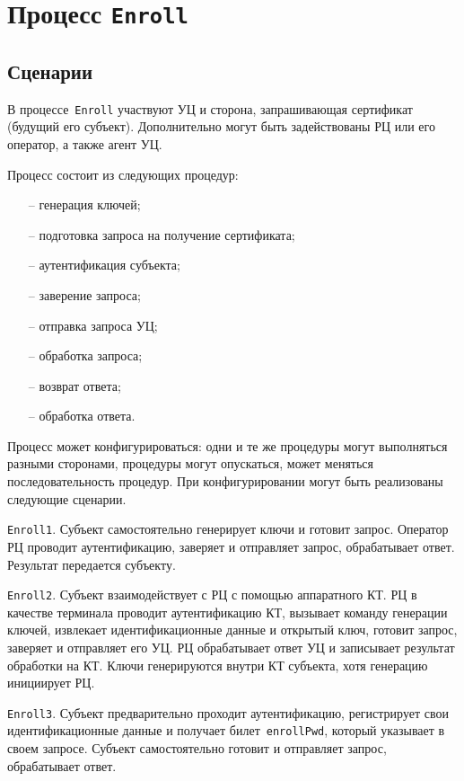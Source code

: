 \section{Процесс \texttt{Enroll}}\label{PROCESSES.Enroll}

\subsection{Сценарии}\label{PROCESSES.Enroll.List}

В процессе~\texttt{Enroll} участвуют УЦ и сторона, запрашивающая 
сертификат (будущий его субъект). Дополнительно могут быть задействованы
РЦ или его оператор, а также агент УЦ. 

Процесс состоит из следующих процедур:
\begin{itemize}
\item[--]
генерация ключей;
\item[--]
подготовка запроса на получение сертификата;
\item[--]
аутентификация субъекта;
\item[--]
заверение запроса;
\item[--]
отправка запроса УЦ;
\item[--]
обработка запроса;
\item[--]
возврат ответа;
\item[--]
обработка ответа.
\end{itemize}

Процесс может конфигурироваться: 
одни и те же процедуры могут выполняться разными сторонами,
процедуры могут опускаться, может меняться последовательность 
процедур. При конфигурировании могут быть реализованы следующие сценарии.

\texttt{Enroll1}. 
Субъект самостоятельно генерирует ключи и готовит запрос.
Оператор РЦ проводит аутентификацию, заверяет и отправляет запрос, 
обрабатывает ответ. Результат передается субъекту.

\texttt{Enroll2}. 
Субъект взаимодействует с РЦ с помощью аппаратного КТ. РЦ в качестве 
терминала проводит аутентификацию КТ, вызывает команду генерации ключей,
извлекает идентификационные данные и открытый ключ, готовит запрос, 
заверяет и отправляет его УЦ. РЦ обрабатывает ответ УЦ и записывает 
результат обработки на КТ. Ключи генерируются внутри КТ субъекта,
хотя генерацию инициирует РЦ.

\texttt{Enroll3}.
Субъект предварительно проходит аутентификацию, регистрирует свои 
идентификационные данные и получает билет~\texttt{enrollPwd}, 
который указывает в своем запросе. Субъект самостоятельно готовит и 
отправляет запрос, обрабатывает ответ.

